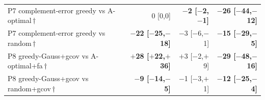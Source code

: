 \begin{tabular}{@{}lrrr@{}}
P7 complement-error greedy vs A-optimal\,$\dagger$ & 0 [0,0] & \textbf{$-$2 [$-$2,$-$1]} & \textbf{$-$26 [$-$44,$-$12]} \\
P7 complement-error greedy vs random\,$\dagger$ & \textbf{$-$22 [$-$25,$-$18]} & $-$3 [$-$6,$-$1] & \textbf{$-$15 [$-$29,$-$5]} \\
P8 greedy-Gauss+gcov vs A-optimal+fa\,$\dagger$ & \textbf{$+$28 [$+$22,$+$36]} & $+$3 [$-$2,$+$9] & \textbf{$-$29 [$-$48,$-$16]} \\
P8 greedy-Gauss+gcov vs random+gcov\,$\dagger$ & \textbf{$-$9 [$-$14,$-$5]} & $-$1 [$-$3,$+$1] & \textbf{$-$12 [$-$25,$-$4]} \\
\bottomrule
\end{tabular}
